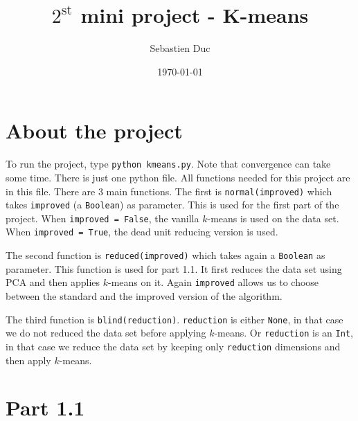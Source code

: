 \documentclass[12pt,a4paper]{article}
\author{Sebastien Duc}
\date{\today}
\title{$2^{\mathrm{st}}$ mini project - K-means}
\begin{document}
\maketitle
{}
\section*{About the project}
To run the project, type \texttt{python kmeans.py}. Note that convergence can take some time. There is just one python file. All functions needed for this project are in this file.
There are 3 main functions. The first is \texttt{normal(improved)} which takes \texttt{improved} (a \texttt{Boolean}) as parameter. This is used for the first part of the project.
When \texttt{improved = False}, the vanilla $k$-means is used on the data set. When \texttt{improved = True}, the dead unit reducing version is used.

The second function is \texttt{reduced(improved)} which takes again a \texttt{Boolean} as parameter. This function is used for part 1.1. It first reduces the data set using PCA and 
then applies $k$-means on it. Again \texttt{improved} allows us to choose between the standard and the improved version of the algorithm.

The third function is \texttt{blind(reduction)}. \texttt{reduction} is either \texttt{None}, in that case we do not reduced the data set before applying $k$-means. Or 
\texttt{reduction} is an \texttt{Int}, in that case we reduce the data set by keeping only \texttt{reduction} dimensions and then apply $k$-means.

\section*{Part 1.1}
\end{document}
